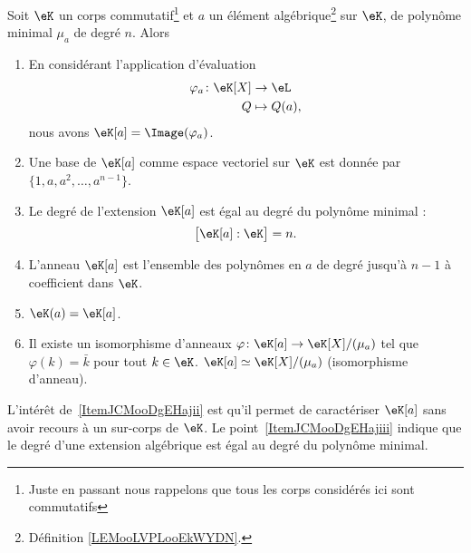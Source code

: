 \begin{proposition}   \label{PropURZooVtwNXE}
	Soit \( \eK\) un corps commutatif\footnote{Juste en passant nous rappelons que tous les corps considérés ici sont commutatifs} et \( a\) un élément algébrique\footnote{Définition \ref{LEMooLVPLooEkWYDN}.} sur \( \eK\), de polynôme minimal \( \mu_a\) de degré \( n\). Alors
	\begin{enumerate}
		\item\label{ItemJCMooDgEHajmi}
		      En considérant l'application d'évaluation
		      \begin{equation}
			      \begin{aligned}
				      \varphi_a\colon \eK[X] & \to \eL       \\
				      Q                      & \mapsto Q(a),
			      \end{aligned}
		      \end{equation}
		      nous avons \( \eK[a]=\Image(\varphi_a)\).
		\item\label{ItemJCMooDgEHajiv}
		      Une base de \( \eK[a]\) comme espace vectoriel sur \( \eK\) est donnée par \( \{ 1,a,a^2,\ldots, a^{n-1} \}\).
		\item\label{ItemJCMooDgEHajiii}
		      Le degré de l'extension \( \eK[a]\) est égal au degré du polynôme minimal :
		      \begin{equation}
			      \big[ \eK[a]:\eK \big]=n.
		      \end{equation}
		\item
		      L'anneau \( \eK[a]\) est l'ensemble des polynômes en \( a\) de degré jusqu'à \( n-1\) à coefficient dans \( \eK\).
		\item\label{ItemJCMooDgEHaji}
		      \( \eK(a)=\eK[a]\).
		\item   \label{ItemJCMooDgEHajii}
		      Il existe un isomorphisme d'anneaux \( \varphi\colon \eK[a]\to \eK[X]/(\mu_a)\) tel que \( \varphi(k)=\bar k\) pour tout \( k\in \eK\).
		      \( \eK[a]\simeq\eK[X]/(\mu_a)\) (isomorphisme d'anneau).
	\end{enumerate}
\end{proposition}
L'intérêt de~\ref{ItemJCMooDgEHajii} est qu'il permet de caractériser \( \eK[a]\) sans avoir recours à un sur-corps de \( \eK\). Le point~\ref{ItemJCMooDgEHajiii} indique que le degré d'une extension algébrique est égal au degré du polynôme minimal.


